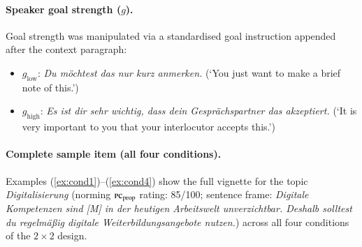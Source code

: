 \documentclass[12pt]{article}
\begin{document}
\paragraph{Speaker goal strength ($g$).}
Goal strength was manipulated via a standardised goal instruction
appended after the context paragraph:

\begin{itemize}
  \item $g_\text{low}$: \textit{Du m\"ochtest das nur kurz anmerken.}
        (`You just want to make a brief note of this.')
  \item $g_\text{high}$: \textit{Es ist dir sehr wichtig, dass dein
        Gespr\"achspartner das akzeptiert.}
        (`It is very important to you that your interlocutor accepts this.')
\end{itemize}

\paragraph{Complete sample item (all four conditions).}
Examples (\ref{ex:cond1})--(\ref{ex:cond4}) show the full vignette for
the topic \textit{Digitalisierung}
(norming $\textsc{pc}_\text{prop}$ rating: 85/100;
sentence frame: \textit{Digitale Kompetenzen sind [M] in der heutigen
Arbeitswelt unverzichtbar.
Deshalb solltest du regelm\"a\ss{}ig digitale Weiterbildungsangebote nutzen.})
across all four conditions of the $2\times2$ design.
\end{document}
